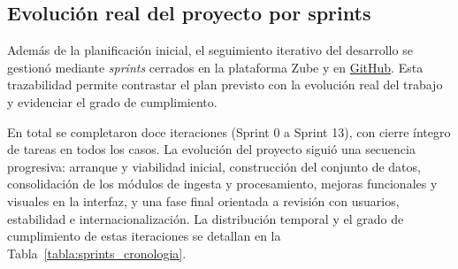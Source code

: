 
\subsection{Evolución real del proyecto por sprints}

Además de la planificación inicial, el seguimiento iterativo del desarrollo se
gestionó mediante \textit{sprints} cerrados en la plataforma Zube y en
\href{https://github.com/zcc1001/tfg-topics}{GitHub}. Esta trazabilidad permite
contrastar el plan previsto con la evolución real del trabajo y evidenciar el
grado de cumplimiento.

En total se completaron doce iteraciones (Sprint 0 a Sprint 13), con cierre
íntegro de tareas en todos los casos. La evolución del proyecto siguió una
secuencia progresiva: arranque y viabilidad inicial, construcción del conjunto
de datos, consolidación de los módulos de ingesta y procesamiento, mejoras
funcionales y visuales en la interfaz, y una fase final orientada a revisión
con usuarios, estabilidad e internacionalización. La distribución temporal y el
grado de cumplimiento de estas iteraciones se detallan en la
Tabla~\ref{tabla:sprints_cronologia}.

